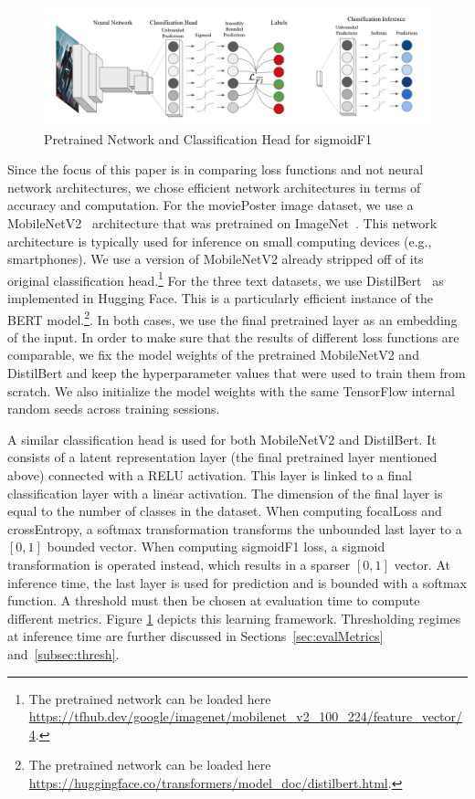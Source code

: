 \begin{figure}[htbp]
\centering
\includegraphics[width=.9\linewidth]{./images/architecture.png}
\caption{\label{fig:architecture}
Pretrained Network and Classification Head for sigmoidF1 }
\end{figure}

Since the focus of this paper is in comparing loss functions and not neural network architectures, we chose efficient network architectures in terms of accuracy and computation.
For the moviePoster image dataset, we use a MobileNetV2~\cite{mobileNet} architecture that was pretrained on ImageNet~\cite{imagenet}. This network architecture is typically used for inference on small computing devices (e.g., smartphones). We use a version of MobileNetV2 already stripped off of its original classification head.\footnote{The pretrained network can be loaded here \url{https://tfhub.dev/google/imagenet/mobilenet_v2_100_224/feature_vector/4}.}
For the three text datasets, we use DistilBert~\cite{distilBert} as implemented in Hugging Face. This is a particularly efficient instance of the BERT model.\footnote{The pretrained network can be loaded here \url{https://huggingface.co/transformers/model_doc/distilbert.html}.}.
In both cases, we use the final pretrained layer as an embedding of the input. In order to make sure that the results of different loss functions are comparable, we fix the model weights of the pretrained MobileNetV2 and DistilBert and keep the hyperparameter values that were used to train them from scratch. We also initialize the model weights with the same TensorFlow internal random seeds across training sessions.

A similar classification head is used for both MobileNetV2 and DistilBert. It consists of a latent representation layer (the final pretrained layer mentioned above) connected with a RELU activation. This layer is linked to a final classification layer with a linear activation. The dimension of the final layer is equal to the number of classes in the dataset. When computing focalLoss and crossEntropy, a softmax transformation transforms the unbounded last layer to a $[0,1]$ bounded vector. When computing sigmoidF1 loss, a sigmoid transformation is operated instead, which results in a sparser $[0,1]$ vector. At inference time, the last layer is used for prediction and is bounded with a softmax function. A threshold must then be chosen at evaluation time to compute different metrics. Figure \ref{fig:architecture} depicts this learning framework. Thresholding regimes at inference time are further discussed in Sections~\ref{sec:evalMetrics} and~\ref{subsec:thresh}.

